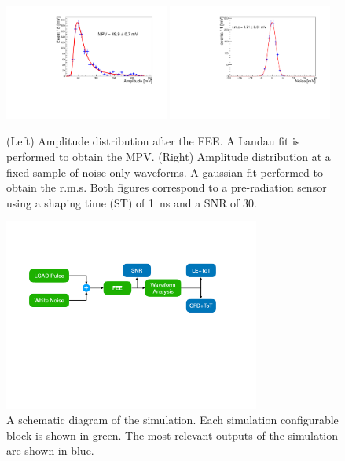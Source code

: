\documentclass[preprint,1p]{elsarticle}
\begin{document}
\begin{figure}[htbp]
  \centering
  \includegraphics[width=0.48\textwidth]{figs/amplitude_1ns_landau_fit.pdf} \hfill
  \includegraphics[width=0.48\textwidth]{figs/noise_plot_snr30.pdf}
  \caption{(Left) Amplitude distribution after the FEE. A Landau fit is performed to obtain the MPV.
  (Right) Amplitude distribution at a fixed sample of noise-only waveforms. A gaussian fit performed to obtain the r.m.s.
  Both figures correspond to a pre-radiation sensor using a shaping time (ST) of 1~\si{ns} and a SNR of 30.}
  \label{fig:amp_and_noise}
\end{figure}

\begin{figure}[htbp]
\centering
\includegraphics[width=0.75\textwidth]{figs/lgad_simulation_diagram.pdf}
\caption{A schematic diagram of the simulation. Each simulation configurable
	block is shown in green. The most relevant outputs of the simulation are shown
	in blue.} \label{fig:simulation_diagram}
\end{figure}
\end{document}
